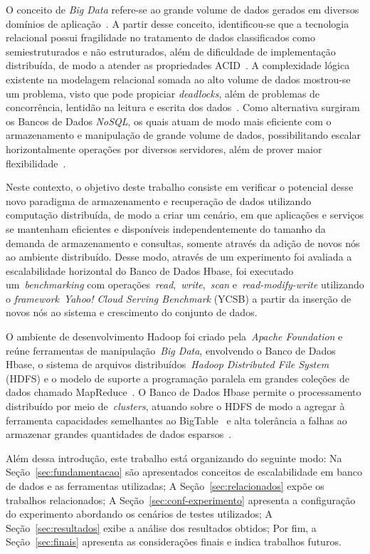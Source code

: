 \documentclass[12pt]{article}
\begin{document}
O conceito de \textit{Big Data} refere-se ao grande volume de dados gerados em diversos domínios de aplicação~\cite{han2011survey}. A partir desse conceito, identificou-se que a tecnologia relacional possui fragilidade no tratamento de dados classificados como semiestruturados e não estruturados, além de dificuldade de implementação distribuída, de modo a atender as propriedades ACID~\cite{aparicio:2016}. A complexidade lógica existente na modelagem relacional somada ao alto volume de dados mostrou-se um problema, visto que pode propiciar \textit{deadlocks}, além de problemas de concorrência, lentidão na leitura e escrita dos dados~\cite{han2011survey}. Como alternativa surgiram os Bancos de Dados \textit{NoSQL}, os quais atuam de modo mais eficiente com o armazenamento e manipulação de grande volume de dados, possibilitando escalar horizontalmente operações por diversos servidores, além de prover maior flexibilidade~\cite{ramesh:2016}.

Neste contexto, o objetivo deste trabalho consiste em verificar o potencial desse novo paradigma de armazenamento e recuperação de dados utilizando computação distribuída, de modo a criar um cenário, em que aplicações e serviços se mantenham eficientes e disponíveis independentemente do tamanho da demanda de armazenamento e consultas, somente através da adição de novos nós ao ambiente distribuído. Desse modo, através de um experimento foi avaliada a escalabilidade horizontal do Banco de Dados Hbase, foi executado um~\emph{benchmarking} com operações~\emph{read},~\emph{write},~\emph{scan} e~\emph{read-modify-write} utilizando o \textit{framework}~\emph{Yahoo! Cloud Serving Benchmark} (YCSB) a partir da inserção de novos nós ao sistema e crescimento do conjunto de dados.

O ambiente de desenvolvimento Hadoop foi criado pela~\emph{Apache Foundation} e reúne ferramentas de manipulação~\emph{Big Data}, envolvendo o Banco de Dados Hbase, o sistema de arquivos distribuídos~\emph{Hadoop Distributed File System} (HDFS) e o modelo de suporte a programação paralela em grandes coleções de dados chamado MapReduce~\cite{hadoophbase}. O Banco de Dados Hbase permite o processamento distribuído por meio de~\emph{clusters}, atuando sobre o HDFS de modo a agregar à ferramenta capacidades semelhantes ao BigTable~\cite{chang2008bigtable} e alta tolerância a falhas ao armazenar grandes quantidades de dados esparsos~\cite{hadoophbase}.

Além dessa introdução, este trabalho está organizando do seguinte modo: Na Seção~\ref{sec:fundamentacao} são apresentados conceitos de escalabilidade em banco de dados e as ferramentas utilizadas; A Seção~\ref{sec:relacionados} expõe os trabalhos relacionados; A Seção~\ref{sec:conf-experimento} apresenta a configuração do experimento abordando os cenários de testes utilizados; A Seção~\ref{sec:resultados} exibe a análise dos resultados obtidos; Por fim, a Seção~\ref{sec:finais} apresenta as considerações finais e indica trabalhos futuros.
\end{document}
